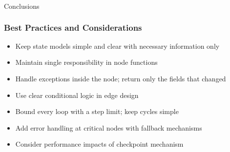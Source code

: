 \begin{frame}[fragile]\frametitle{}
\begin{center}
{\Large Conclusions}
\end{center}
\end{frame}

\begin{frame}[fragile]\frametitle{Best Practices and Considerations}
      \begin{itemize}
        \item Keep state models simple and clear with necessary information only
        \item Maintain single responsibility in node functions
        \item Handle exceptions inside the node; return only the fields that changed
        \item Use clear conditional logic in edge design
        \item Bound every loop with a step limit; keep cycles simple
        \item Add error handling at critical nodes with fallback mechanisms
        \item Consider performance impacts of checkpoint mechanism
      \end{itemize}
\end{frame}

